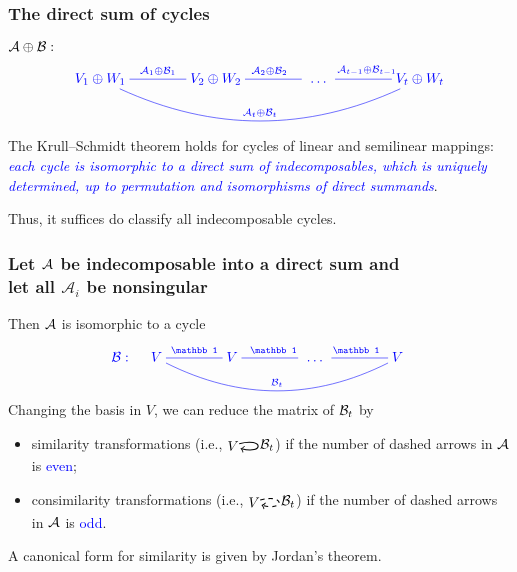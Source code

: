 \documentclass[usenames,dvipsnames]{beamer}
\begin{document}
\begin{frame}
\frametitle{The \alert{direct sum} of
cycles} \vspace{-1cm} \alert{${\cal
A}\oplus {\cal B}:$}
\[
\textcolor{blue}{\xymatrix@C=40pt{
     {V_1\oplus W_1}
\ar@{-}@/_2.5pc/[rrr]^{
\mathcal A_t\oplus\mathcal B_t }
\ar@{-}[r]^{\mathcal A_1\oplus
\mathcal B_1}
         &
     V_2\oplus W_2
\ar@{-}[r]^{\ \mathcal A_2\oplus\mathcal B_2}
         &
{\ \dots\ }
         &{V_t\oplus W_t}
\ar@{-}[l]_{\mathcal A_{t-1}
\oplus\mathcal B_{t-1}\ }
}}
\]
\bigskip

\pause

The \alert{Krull--Schmidt theorem}
holds for cycles of linear and
semilinear mappings:
\textcolor{blue}{\it each cycle is
isomorphic to a direct sum of
indecomposables, which is uniquely
determined, up to permutation and
isomorphisms of direct summands}.
\medskip

Thus, it suffices do classify all
indecomposable cycles.


\end{frame}


\begin{frame}

\frametitle{Let $\cal
A$ be indecomposable into a direct
sum and\\
 let
all $\mathcal A_i$ be
nonsingular}

Then $\cal A$ is isomorphic to a cycle
 \[\textcolor{blue}{
 {\cal B}:\quad\xymatrix @C=40pt{
     V
\ar@{-}@/_2.0pc/[rrr]^{
\mathcal B_t }
\ar@{-}[r]^{\mathbb 1}
         &
     V
\ar@{-}[r]^{\mathbb 1}
         &
{\ \dots\ }
         &V
\ar@{-}[l]_{\mathbb 1}
}}
\]
Changing the basis in $V$, we can reduce the matrix of ${\cal B}_t$ by
\begin{itemize}
  \item \alert{similarity transformations} (i.e., $
      \!\!\raisebox{-1.7mm}
      {\begin{tikzpicture}[->,thick,xscale=1.3,
      yscale=1.3] \node (1)
  {$V$\!\!}; \path (1)
    edge [loop right]
(1);
\end{tikzpicture}}\!\!
{\cal B}_t$) if the number of dashed
  arrows in $\cal A$ is
  \textcolor{blue}{even};

  \item \alert{consimilarity transformations}
      (i.e., $\!\!\raisebox{-1.7mm}
{\begin{tikzpicture}[->,thick,xscale=1.3,
      yscale=1.3] \node (1)
  {$V$\!\!}; \path
    (1) edge [dashed,loop right]
(1);
\end{tikzpicture}}\!\!{\cal B}_t$)
if the number of dashed arrows in
  $\cal A$ is
  \textcolor{blue}{odd}.
\end{itemize}
\vspace{0.5cm}

A canonical form  for similarity
is given by Jordan's theorem.
\end{frame}
\end{document}
